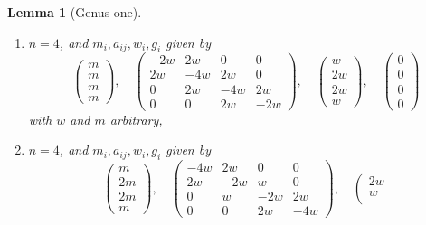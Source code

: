 \documentclass{stacks-project}
\theoremstyle{plain}
\newtheorem{lemma}[subsection]{Lemma}
\theoremstyle{definition}
\theoremstyle{remark}
\numberwithin{equation}{subsection}
\begin{document}
\begin{lemma}[Genus one]
\begin{enumerate}
$$\begin{matrix}
2w \\
2w \\
4w
\end{matrix}
\right),
\quad
\left(
\begin{matrix}
0 \\
0 \\
0 \\
0
\end{matrix}
\right)
$$
with $w$ and $m$ arbitrary,
\item
\label{item-up-equal-down}
$n = 4$, and $m_i, a_{ij}, w_i, g_i$ given by
$$
\left(
\begin{matrix}
m \\
m \\
m \\
m
\end{matrix}
\right),
\quad
\left(
\begin{matrix}
-2w & 2w & 0 & 0 \\
2w & -4w & 2w & 0 \\
0 & 2w & -4w & 2w \\
0 & 0 & 2w & -2w
\end{matrix}
\right),
\quad
\left(
\begin{matrix}
w \\
2w \\
2w \\
w
\end{matrix}
\right),
\quad
\left(
\begin{matrix}
0 \\
0 \\
0 \\
0
\end{matrix}
\right)
$$
with $w$ and $m$ arbitrary,
\item
\label{item-down-equal-up}
$n = 4$, and $m_i, a_{ij}, w_i, g_i$ given by
$$
\left(
\begin{matrix}
m \\
2m \\
2m \\
m
\end{matrix}
\right),
\quad
\left(
\begin{matrix}
-4w & 2w & 0 & 0 \\
2w & -2w & w & 0 \\
0 & w & -2w & 2w \\
0 & 0 & 2w & -4w
\end{matrix}
\right),
\quad
\left(
\begin{matrix}
2w \\
w \\

\end{matrix}$$
\end{enumerate}
\end{lemma}
\end{document}
